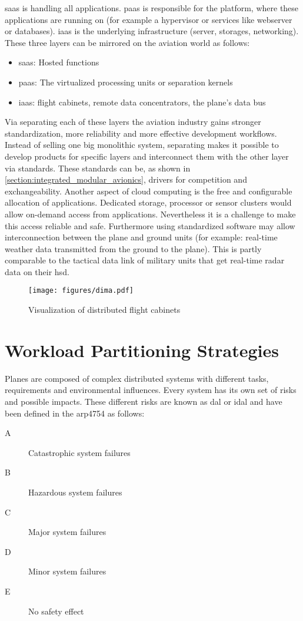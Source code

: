 \documentclass[titlepage]{report}
\begin{document}
\gls{saas} is handling all applications. \gls{paas} is responsible for the platform, where these applications
are running on (for example a hypervisor or services like webserver or databases). \gls{iaas} is the underlying
infrastructure (server, storages, networking). These three layers can be mirrored on the aviation world as follows:
\begin{itemize}
    \item \gls{saas}: Hosted functions
    \item \gls{paas}: The virtualized processing units or separation kernels
    \item \gls{iaas}: flight cabinets, remote data concentrators, the plane's data bus
\end{itemize}
Via separating each of these layers the aviation industry gains stronger standardization, more reliability and more effective
development workflows. Instead of selling one big monolithic system, separating makes it possible to develop products
for specific layers and interconnect them with the other layer via standards. These standards can be, as shown in \autoref{section:integrated_modular_avionics},
drivers for competition and exchangeability. Another aspect of cloud computing is the free and configurable allocation of applications\cite{li2012avionics}.
Dedicated storage, processor or sensor clusters would allow on-demand access from applications. Nevertheless it is a challenge to make this access reliable
and safe. Furthermore using standardized software may allow
interconnection between the plane and ground units (for example: real-time weather data transmitted from the ground to the plane).
This is partly comparable to the tactical data link of military units that get real-time radar data on their \gls{hsd}.

\begin{figure}
    \centering
    \texttt{[image: figures/dima.pdf]}
    \caption{Visualization of distributed flight cabinets}\label{fig:dima}
\end{figure}

\section{Workload Partitioning Strategies}\label{section:workload_partitioning_strategies}
Planes are composed of complex distributed systems with different tasks, requirements and environmental influences.
Every system has its own set of risks and possible impacts.
These different risks are known as \gls{dal} or \gls{idal} and have been defined
in the \gls{arp4754} as follows\cite{arp4754a2010guidelines}:
\begin{description}
    \item[A] Catastrophic system failures
    \item[B] Hazardous system failures
    \item[C] Major system failures
    \item[D] Minor system failures
    \item[E] No safety effect    
\end{description}
\end{document}
